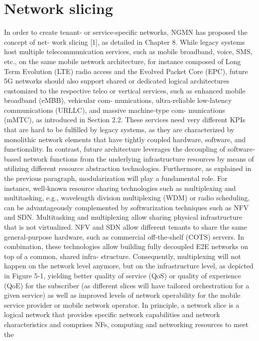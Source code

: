 \documentclass{article}
\begin{document}
\newpage
\section{Network slicing} %
In order to create tenant‐ or service‐specific networks, NGMN has proposed the concept of net-
work slicing [1], as detailed in Chapter 8. While legacy systems host multiple telecommunication
services, such as mobile broadband, voice, SMS, etc., on the same mobile network architecture, for
instance composed of Long Term Evolution (LTE) radio access and the Evolved Packet Core (EPC),
future 5G networks should also support shared or dedicated logical architectures customized to the
respective telco or vertical services, such as enhanced mobile broadband (eMBB), vehicular com-
munications, ultra‐reliable low‐latency communications (URLLC), and massive machine‐type com-
munications (mMTC), as introduced in Section 2.2. These services need very different KPIs that are
hard to be fulfilled by legacy systems, as they are characterized by monolithic network elements that
have tightly coupled hardware, software, and functionality. In contrast, future architecture leverages the decoupling of software‐based network functions from the underlying infrastructure resources by
means of utilizing different resource abstraction technologies.
Furthermore, as explained in the previous paragraph, modularization will play a fundamental role.
For instance, well‐known resource sharing technologies such as multiplexing and multitasking, e.g.,
wavelength division multiplexing (WDM) or radio scheduling, can be advantageously complemented
by softwarization techniques such as NFV and SDN. Multitasking and multiplexing allow sharing
physical infrastructure that is not virtualized. NFV and SDN allow different tenants to share the
same general‐purpose hardware, such as commercial off‐the‐shelf (COTS) servers. In combination,
these technologies allow building fully decoupled E2E networks on top of a common, shared infra-
structure. Consequently, multiplexing will not happen on the network level anymore, but on the
infrastructure level, as depicted in Figure 5‐1, yielding better quality of service (QoS) or quality of
experience (QoE) for the subscriber (as different slices will have tailored orchestration for a given
service) as well as improved levels of network operability for the mobile service provider or mobile
network operator.
In principle, a network slice is a logical network that provides specific network capabilities and
network characteristics and comprises NFs, computing and networking resources to meet the
\end{document}
